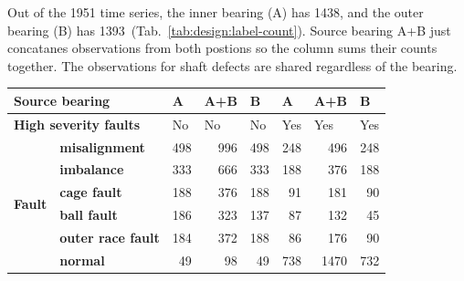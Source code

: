 Out of the 1951 time series, the inner bearing (A) has 1438, and the outer bearing (B) has 1393~(Tab.~\ref{tab:design:label-count}). Source bearing A+B just concatanes observations from both postions so the column sums their counts together. The observations for shaft defects are shared regardless of the bearing. 
\begin{table}[h]
\renewcommand{\arraystretch}{1.2}
\centering
\begin{tabular}{|ll|r|r|r|r|r|r|}
\hline
\multicolumn{2}{|l|}{\textbf{Source bearing}}                                            & \multicolumn{1}{l|}{A}  & \multicolumn{1}{l|}{A+B} & \multicolumn{1}{l|}{B}  & \multicolumn{1}{l|}{A}   & \multicolumn{1}{l|}{A+B} & \multicolumn{1}{l|}{B}   \\ \hline
\multicolumn{2}{|l|}{\textbf{High severity faults}}                                & \multicolumn{1}{l|}{No} & \multicolumn{1}{l|}{No}  & \multicolumn{1}{l|}{No} & \multicolumn{1}{l|}{Yes} & \multicolumn{1}{l|}{Yes} & \multicolumn{1}{l|}{Yes} \\ \hline
\multicolumn{1}{|l|}{\multirow{6}{*}{\textbf{Fault}}} & \textbf{misalignment}     & 498                     & 996                      & 498                     & 248                      & 496                      & 248                      \\ \cline{2-8} 
\multicolumn{1}{|l|}{}                                & \textbf{imbalance}        & 333                     & 666                      & 333                     & 188                      & 376                      & 188                      \\ \cline{2-8} 
\multicolumn{1}{|l|}{}                                & \textbf{cage fault}       & 188                     & 376                      & 188                     & 91                       & 181                      & 90                       \\ \cline{2-8} 
\multicolumn{1}{|l|}{}                                & \textbf{ball fault}       & 186                     & 323                      & 137                     & 87                       & 132                      & 45                       \\ \cline{2-8} 
\multicolumn{1}{|l|}{}                                & \textbf{outer race fault} & 184                     & 372                      & 188                     & 86                       & 176                      & 90                       \\ \cline{2-8} 
\multicolumn{1}{|l|}{}                                & \textbf{normal}           & 49                      & 98                       & 49                      & 738                      & 1470                     & 732                      \\ \hline

\end{tabular}
\end{table}
